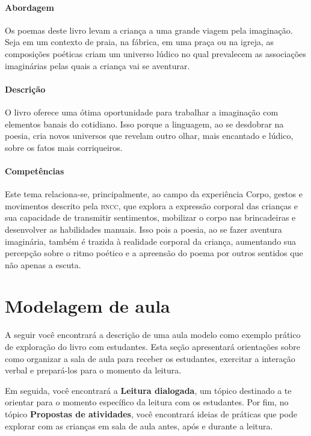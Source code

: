 \documentclass[11pt]{extarticle}
\begin{document}
\paragraph{Abordagem} Os poemas deste livro levam a criança a uma grande viagem pela imaginação. Seja em um contexto de praia, na fábrica, em uma praça ou na igreja, as composições poéticas criam um universo lúdico no qual prevalecem as associações imaginárias pelas quais a criança vai se aventurar.

\paragraph{Descrição} O livro oferece uma ótima oportunidade para trabalhar a imaginação com elementos banais do cotidiano. Isso porque a linguagem, ao se desdobrar na poesia, cria novos universos que revelam outro olhar, mais encantado e lúdico, sobre os fatos mais corriqueiros.

\paragraph{Competências} Este tema relaciona-se, principalmente, ao 
campo da experiência Corpo, gestos e movimentos
descrito pela \textsc{bncc}, que explora a expressão corporal das crianças e sua capacidade de transmitir sentimentos, mobilizar o corpo nas brincadeiras e desenvolver as habilidades manuais. Isso pois a poesia, ao se fazer aventura imaginária, também é trazida à realidade corporal da criança, aumentando sua percepção sobre o ritmo poético e a apreensão do poema por outros sentidos que não apenas a escuta.


\section{Modelagem de aula}
A seguir você encontrará a descrição de uma aula modelo como exemplo 
prático de exploração do livro com estudantes. Esta seção apresentará 
orientações sobre como organizar a sala de aula para receber os 
estudantes, exercitar a interação verbal e prepará-los para o 
momento da leitura.

Em seguida, você encontrará a \textbf{Leitura dialogada}, um 
tópico destinado a te orientar para o momento específico da 
leitura com os estudantes. Por fim, no tópico 
\textbf{Propostas de atividades}, você encontrará ideias 
de práticas que pode explorar com as crianças em sala de 
aula antes, após e durante a leitura. 
\end{document}
